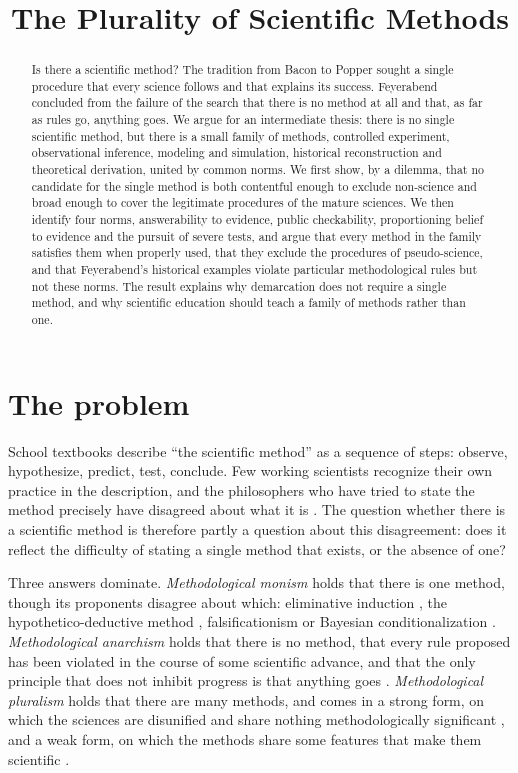 \documentclass{situationist-preprint}
\title{The Plurality of Scientific Methods}
\begin{document}
\maketitle

\begin{abstract}
Is there a scientific method? The tradition from Bacon to Popper sought a single procedure that every science follows and that explains its success. Feyerabend concluded from the failure of the search that there is no method at all and that, as far as rules go, anything goes. We argue for an intermediate thesis: there is no single scientific method, but there is a small family of methods, controlled experiment, observational inference, modeling and simulation, historical reconstruction and theoretical derivation, united by common norms. We first show, by a dilemma, that no candidate for the single method is both contentful enough to exclude non-science and broad enough to cover the legitimate procedures of the mature sciences. We then identify four norms, answerability to evidence, public checkability, proportioning belief to evidence and the pursuit of severe tests, and argue that every method in the family satisfies them when properly used, that they exclude the procedures of pseudo-science, and that Feyerabend's historical examples violate particular methodological rules but not these norms. The result explains why demarcation does not require a single method, and why scientific education should teach a family of methods rather than one.
\end{abstract}

\section{The problem}

School textbooks describe \enquote{the scientific method} as a sequence of steps: observe, hypothesize, predict, test, conclude. Few working scientists recognize their own practice in the description, and the philosophers who have tried to state the method precisely have disagreed about what it is \citep{Bauer1992}. The question whether there is a scientific method is therefore partly a question about this disagreement: does it reflect the difficulty of stating a single method that exists, or the absence of one?

Three answers dominate. \emph{Methodological monism} holds that there is one method, though its proponents disagree about which: eliminative induction \citep{Bacon1620}, the hypothetico-deductive method \citep{Hempel1966}, falsificationism \citep{Popper1959} or Bayesian conditionalization \citep{HowsonUrbach2006}. \emph{Methodological anarchism} holds that there is no method, that every rule proposed has been violated in the course of some scientific advance, and that the only principle that does not inhibit progress is that anything goes \citep{Feyerabend1975}. \emph{Methodological pluralism} holds that there are many methods, and comes in a strong form, on which the sciences are disunified and share nothing methodologically significant \citep{Dupre1993}, and a weak form, on which the methods share some features that make them scientific \citep{HoyningenHuene2013}.
\end{document}
